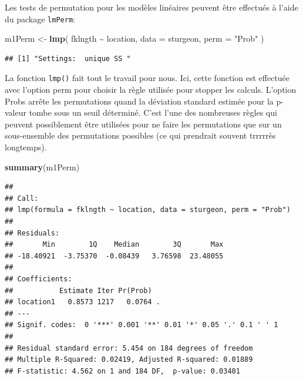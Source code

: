 \documentclass[
  12pt,
]{book}
\newenvironment{Shaded}{\begin{snugshade}}{\end{snugshade}}
\newcommand{\DataTypeTok}[1]{\textcolor[rgb]{0.13,0.29,0.53}{#1}}
\newcommand{\KeywordTok}[1]{\textcolor[rgb]{0.13,0.29,0.53}{\textbf{#1}}}
\newcommand{\NormalTok}[1]{#1}
\newcommand{\OperatorTok}[1]{\textcolor[rgb]{0.81,0.36,0.00}{\textbf{#1}}}
\newcommand{\StringTok}[1]{\textcolor[rgb]{0.31,0.60,0.02}{#1}}
\begin{document}
Les tests de permutation pour les modèles linéaires peuvent être effectués à l'aide du package \texttt{lmPerm}:

\begin{Shaded}
\begin{Highlighting}[]
\NormalTok{m1Perm \textless{}{-}}\StringTok{ }\KeywordTok{lmp}\NormalTok{(}
\NormalTok{  fklngth }\OperatorTok{\textasciitilde{}}\StringTok{ }\NormalTok{location,}
  \DataTypeTok{data =}\NormalTok{ sturgeon,}
  \DataTypeTok{perm =} \StringTok{"Prob"}
\NormalTok{)}
\end{Highlighting}
\end{Shaded}

\begin{verbatim}
## [1] "Settings:  unique SS "
\end{verbatim}

La fonction \texttt{lmp()} fait tout le travail pour nous. Ici, cette fonction est effectuée avec l'option perm pour choisir la règle utilisée pour stopper les calculs. L'option Probs arrête les permutations quand la déviation standard estimée pour la p-valeur tombe sous un seuil déterminé. C'est l'une des nombreuses règles qui peuvent possiblement être utilisées pour ne faire les permutations que sur un sous-ensemble des permutations possibles (ce qui prendrait souvent trrrrrès longtemps).

\begin{Shaded}
\begin{Highlighting}[]
\KeywordTok{summary}\NormalTok{(m1Perm)}
\end{Highlighting}
\end{Shaded}

\begin{verbatim}
## 
## Call:
## lmp(formula = fklngth ~ location, data = sturgeon, perm = "Prob")
## 
## Residuals:
##       Min        1Q    Median        3Q       Max 
## -18.40921  -3.75370  -0.08439   3.76598  23.48055 
## 
## Coefficients:
##           Estimate Iter Pr(Prob)  
## location1   0.8573 1217   0.0764 .
## ---
## Signif. codes:  0 '***' 0.001 '**' 0.01 '*' 0.05 '.' 0.1 ' ' 1
## 
## Residual standard error: 5.454 on 184 degrees of freedom
## Multiple R-Squared: 0.02419, Adjusted R-squared: 0.01889 
## F-statistic: 4.562 on 1 and 184 DF,  p-value: 0.03401
\end{verbatim}
\end{document}
